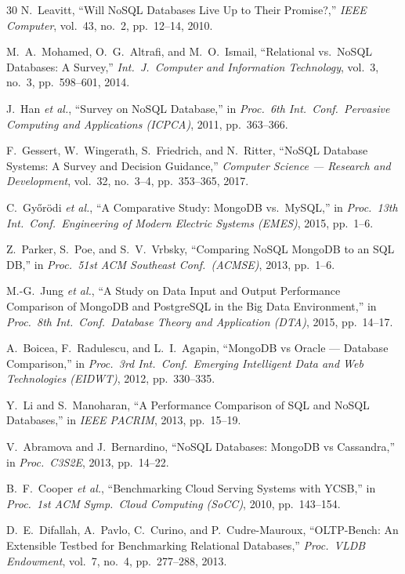 \documentclass[10pt,a4paper,twocolumn]{article}
\begin{document}
\begin{thebibliography}{30}
N.~Leavitt, ``Will NoSQL Databases Live Up to Their Promise?,'' \emph{IEEE Computer},
vol.~43, no.~2, pp.~12--14, 2010.

M.~A.~Mohamed, O.~G.~Altrafi, and M.~O.~Ismail, ``Relational vs.\ NoSQL Databases:
A Survey,'' \emph{Int.\ J.\ Computer and Information Technology}, vol.~3, no.~3,
pp.~598--601, 2014.

J.~Han \emph{et al.}, ``Survey on NoSQL Database,'' in \emph{Proc.\ 6th Int.\ Conf.\
Pervasive Computing and Applications (ICPCA)}, 2011, pp.~363--366.

F.~Gessert, W.~Wingerath, S.~Friedrich, and N.~Ritter, ``NoSQL Database Systems:
A Survey and Decision Guidance,'' \emph{Computer Science --- Research and Development},
vol.~32, no.~3--4, pp.~353--365, 2017.

C.~Gy\H{o}r\"{o}di \emph{et al.}, ``A Comparative Study: MongoDB vs.\ MySQL,'' in
\emph{Proc.\ 13th Int.\ Conf.\ Engineering of Modern Electric Systems (EMES)}, 2015,
pp.~1--6.

Z.~Parker, S.~Poe, and S.~V.~Vrbsky, ``Comparing NoSQL MongoDB to an SQL DB,'' in
\emph{Proc.\ 51st ACM Southeast Conf.\ (ACMSE)}, 2013, pp.~1--6.

M.-G.~Jung \emph{et al.}, ``A Study on Data Input and Output Performance Comparison of
MongoDB and PostgreSQL in the Big Data Environment,'' in \emph{Proc.\ 8th Int.\ Conf.\
Database Theory and Application (DTA)}, 2015, pp.~14--17.

A.~Boicea, F.~Radulescu, and L.~I.~Agapin, ``MongoDB vs Oracle --- Database
Comparison,'' in \emph{Proc.\ 3rd Int.\ Conf.\ Emerging Intelligent Data and Web
Technologies (EIDWT)}, 2012, pp.~330--335.

Y.~Li and S.~Manoharan, ``A Performance Comparison of SQL and NoSQL Databases,'' in
\emph{IEEE PACRIM}, 2013, pp.~15--19.

V.~Abramova and J.~Bernardino, ``NoSQL Databases: MongoDB vs Cassandra,'' in
\emph{Proc.\ C3S2E}, 2013, pp.~14--22.

B.~F.~Cooper \emph{et al.}, ``Benchmarking Cloud Serving Systems with YCSB,'' in
\emph{Proc.\ 1st ACM Symp.\ Cloud Computing (SoCC)}, 2010, pp.~143--154.

\bibitem{difallah2013oltpbench}
D.~E.~Difallah, A.~Pavlo, C.~Curino, and P.~Cudre-Mauroux, ``OLTP-Bench: An Extensible
Testbed for Benchmarking Relational Databases,'' \emph{Proc.\ VLDB Endowment}, vol.~7,
no.~4, pp.~277--288, 2013.


\end{thebibliography}
\end{document}
